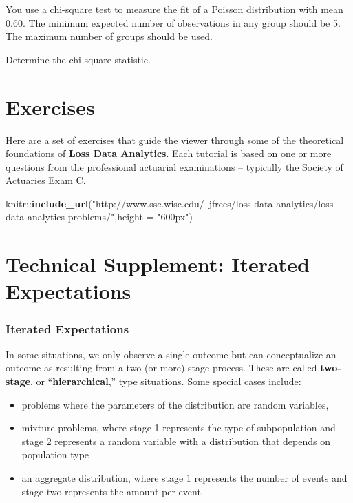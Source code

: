 \documentclass[]{book}
\newenvironment{Shaded}{\begin{snugshade}}{\end{snugshade}}
\newcommand{\KeywordTok}[1]{\textcolor[rgb]{0.13,0.29,0.53}{\textbf{{#1}}}}
\newcommand{\DataTypeTok}[1]{\textcolor[rgb]{0.13,0.29,0.53}{{#1}}}
\newcommand{\StringTok}[1]{\textcolor[rgb]{0.31,0.60,0.02}{{#1}}}
\newcommand{\NormalTok}[1]{{#1}}
\begin{document}
You use a chi-square test to measure the fit of a Poisson distribution
with mean 0.60. The minimum expected number of observations in any group
should be 5. The maximum number of groups should be used.

Determine the chi-square statistic.

\section{Exercises}\label{exercises}

Here are a set of exercises that guide the viewer through some of the
theoretical foundations of \textbf{Loss Data Analytics}. Each tutorial
is based on one or more questions from the professional actuarial
examinations -- typically the Society of Actuaries Exam C.

\begin{Shaded}
\begin{Highlighting}[]
\NormalTok{knitr::}\KeywordTok{include_url}\NormalTok{(}\StringTok{"http://www.ssc.wisc.edu/~jfrees/loss-data-analytics/loss-data-analytics-problems/"}\NormalTok{,}\DataTypeTok{height =} \StringTok{"600px"}\NormalTok{)}
\end{Highlighting}
\end{Shaded}

\section{Technical Supplement: Iterated
Expectations}\label{technical-supplement-iterated-expectations}

\subsubsection{Iterated Expectations}\label{iterated-expectations}

In some situations, we only observe a single outcome but can
conceptualize an outcome as resulting from a two (or more) stage
process. These are called \textbf{two-stage}, or
``\textbf{hierarchical},'' type situations. Some special cases include:

\begin{itemize}
\item
  problems where the parameters of the distribution are random
  variables,
\item
  mixture problems, where stage 1 represents the type of subpopulation
  and stage 2 represents a random variable with a distribution that
  depends on population type
\item
  an aggregate distribution, where stage 1 represents the number of
  events and stage two represents the amount per event.
\end{itemize}
\end{document}
